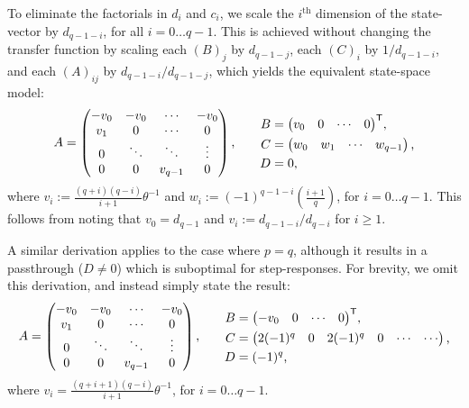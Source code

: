 To eliminate the factorials in $d_i$ and $c_i$, we scale the $i^{\text{th}}$ dimension of the state-vector by $d_{q-1-i}$, for all $i = 0 \ldots q - 1$.
This is achieved without changing the transfer function by scaling each $(B)_j$ by $d_{q-1-j}$, each $(C)_i$ by $1 / d_{q-1-i}$, and each $(A)_{ij}$ by $d_{q-1-i} / d_{q-1-j}$, which yields the equivalent state-space model:
\begin{equation}
    \begin{alignedat}{2}
        A &= \begin{pmatrix} -v_0 & -v_0 & \cdots & -v_0 \\ v_1 & 0 & \cdots & 0 \\ 0 & \ddots & \ddots & \vdots \\ 0 & 0 & v_{q-1} & 0\end{pmatrix} \text{,} & & \quad\quad \begin{alignedat}{1}
            B &= {\begin{pmatrix} v_0 & 0 & \cdots & 0\end{pmatrix}}^\mathsf{T} \text{,} \\
            C &= \begin{pmatrix} w_0 & w_1 & \cdots & w_{q-1} \end{pmatrix} \text{,} \\
            D &= 0 \text{,} \label{eq:ss-delay}
        \end{alignedat}
    \end{alignedat}
\end{equation}
where $v_i := \frac{(q+i)(q-i)}{i+1} \theta^{-1}$ and $w_i := (-1)^{q - 1 - i} \left( \frac{i+1}{q} \right)$, for $i = 0 \ldots q-1$.
This follows from noting that $v_0 = d_{q-1}$ and $v_i := d_{q-1-i} / d_{q-i}$ for $i \ge 1$.

A similar derivation applies to the case where $p = q$, although it results in a passthrough ($D \ne 0$) which is suboptimal for step-responses.
For brevity, we omit this derivation, and instead simply state the result:
\begin{equation*}
    \begin{alignedat}{2}
        A &= \begin{pmatrix} -v_0 & -v_0 & \cdots & -v_0 \\ v_1 & 0 & \cdots & 0 \\ 0 & \ddots & \ddots & \vdots \\ 0 & 0 & v_{q-1} & 0\end{pmatrix} \text{,} & & \quad\quad \begin{alignedat}{1}
            B &= {\begin{pmatrix}-v_0 & 0 & \cdots & 0\end{pmatrix}}^\mathsf{T} \text{,} \\
            C &= \begin{pmatrix} 2(-1)^q & 0 & 2(-1)^q & 0 & \cdots & \cdots \end{pmatrix} \text{,} \\
            D &= (-1)^q \text{,}
        \end{alignedat}
    \end{alignedat}
\end{equation*}
where $v_i = \frac{(q+i+1)(q-i)}{i+1} \theta^{-1}$, for $i = 0 \ldots q-1$.

